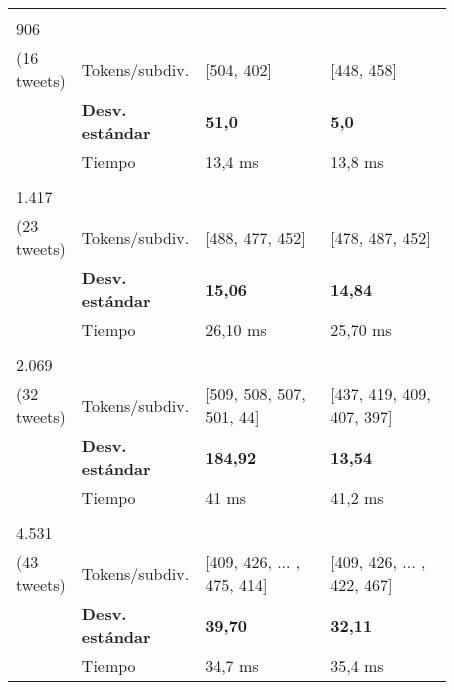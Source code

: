 \begin{table}[h!]
\begin{tabular}{>{\centering}b{0.09\linewidth}>{\raggedright}b{0.18\linewidth}>{\raggedright}b{0.3\linewidth}>{\raggedright\arraybackslash}b{0.3\linewidth}}
		\midrule
		
		\multirow{3}{*}{\begin{minipage}{0.5in}\centering 646\\ \scriptsize{906} \\ \tiny{(16 tweets)} \end{minipage}}	& \small{Tokens/subdiv.} & \small{[504, 402]} & \small{[448, 458]} \\
		& \small{\textbf{Desv. estándar}} & \small{\textbf{51,0}} & \small{\textbf{5,0}} \\
		& \small{Tiempo} & \small{13,4 ms} & \small{13,8 ms} \\
		
		\midrule
		
		\multirow{3}{*}{\begin{minipage}{0.5in}\centering 1.089 \\ \scriptsize{1.417} \\ \tiny{(23 tweets)} \end{minipage}}	& \small{Tokens/subdiv.} & \small{[488, 477, 452]} & \small{[478, 487, 452]} \\
		& \small{\textbf{Desv. estándar}} & \small{\textbf{15,06}} & \small{\textbf{14,84}} \\
		& \small{Tiempo} & \small{26,10 ms} & \small{25,70 ms} \\
		
		\midrule
		
		\multirow{3}{*}{\begin{minipage}{0.5in}\centering 1.536\\ \scriptsize{2.069} \\ \tiny{(32 tweets)} \end{minipage}}	& \small{Tokens/subdiv.} & \small{[509, 508, 507, 501, 44]} & \small{[437, 419, 409, 407, 397]} \\
		& \small{\textbf{Desv. estándar}} & \small{\textbf{184,92}} & \small{\textbf{13,54}} \\
		& \small{Tiempo} & \small{41 ms} & \small{41,2 ms} \\
		
		\midrule
		
		\multirow{3}{*}{\begin{minipage}{0.5in}\centering 1.871\\ \scriptsize{4.531} \\ \tiny{(43 tweets)} \end{minipage}}	& \small{Tokens/subdiv.} & \small{[409, 426, ... , 475, 414]} & \small{[409, 426, ... , 422, 467]} \\
		& \small{\textbf{Desv. estándar}} & \small{\textbf{39,70}} & \small{\textbf{32,11}} \\
		& \small{Tiempo} & \small{34,7 ms} & \small{35,4 ms} \\
		

\end{tabular}
\end{table}
